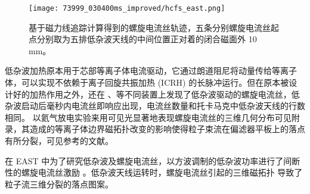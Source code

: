 \begin{figure}[t]
  \centering
  \texttt{[image: 73999\_030400ms\_improved/hcfs\_east.png]}
  \caption{基于磁力线追踪计算得到的螺旋电流丝轨迹，五条分别螺旋电流丝起点分别取为五排低杂波天线的中间位置正对着的闭合磁面外 10 mm。}
\end{figure}

低杂波加热原本用于芯部等离子体电流驱动，它通过朗道阻尼将动量传给等离子体，可以实现不依赖于离子回旋共振加热 (ICRH) 的长脉冲\Hmode 运行。但在原本被设计好的加热作用之外，还在 \ddd、\east 等不同装置上发现了低杂波驱动的螺旋电流丝，低杂波启动后毫秒内电流丝即响应出现，电流丝数量和托卡马克中低杂波天线的行数相同。
以氦气放电实验来用可见光显著地表现螺旋电流丝的三维几何分布可见附录，其造成的等离子体边界磁拓扑改变的影响使得粒子束流在偏滤器平板上的落点有所分裂，可见参考的文献。

  

在 EAST 中为了研究低杂波及螺旋电流丝，以方波调制的低杂波功率进行了间断性的螺旋电流丝激励 。低杂波天线运转时，螺旋电流丝引起的三维磁拓扑 导致了粒子流三维分裂的落点图案。\cite{the_east_team_magnetic_2013}






